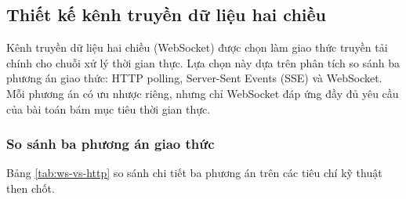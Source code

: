 \subsection{Thiết kế kênh truyền dữ liệu hai chiều}

\hspace{0.5cm} Kênh truyền dữ liệu hai chiều (WebSocket) được chọn làm giao thức truyền tải chính cho chuỗi xử lý thời gian thực. Lựa chọn này dựa trên phân tích so sánh ba phương án giao thức: HTTP polling, Server-Sent Events (SSE) và WebSocket. Mỗi phương án có ưu nhược riêng, nhưng chỉ WebSocket đáp ứng đầy đủ yêu cầu của bài toán bám mục tiêu thời gian thực.

\subsubsection{So sánh ba phương án giao thức}

\hspace{0.5cm} Bảng \ref{tab:ws-vs-http} so sánh chi tiết ba phương án trên các tiêu chí kỹ thuật then chốt.

\begin{table}[H]
\centering
{}
\caption{So sánh ba phương án giao thức truyền tải dữ liệu cho bài toán bám mục tiêu thời gian thực}
\label{tab:ws-vs-http}
\end{table}

